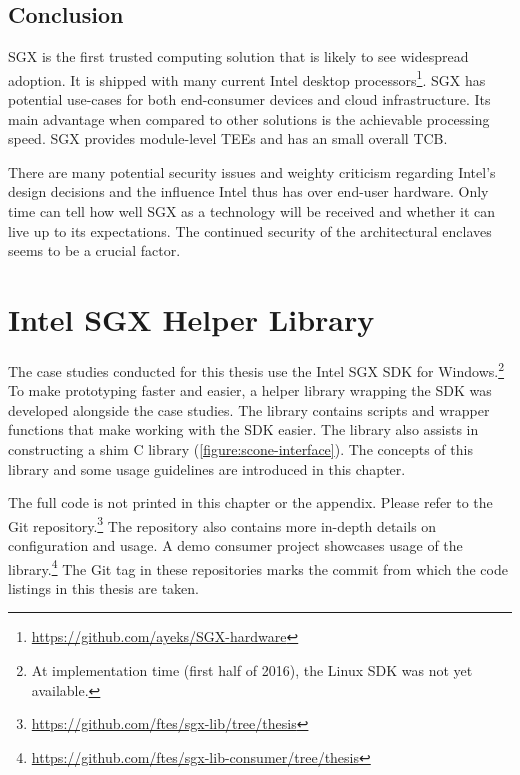 \section{Conclusion\label{ID_95827774}}
SGX is the first trusted computing solution that is likely to see widespread adoption.\label{ID_1283663236}
It is shipped with many current Intel desktop processors\footnote{\url{https://github.com/ayeks/SGX-hardware}}.\label{ID_1220353350}
SGX has potential use-cases for both end-consumer devices and cloud infrastructure.\label{ID_1092135395}
Its main advantage when compared to other solutions is the achievable processing speed. SGX provides module-level TEEs and has an small overall TCB.\label{ID_744293523}

There are many potential security issues and weighty criticism regarding Intel's design decisions and the influence Intel thus has over end-user hardware.\label{ID_856863719}
Only time can tell how well SGX as a technology will be received and whether it can live up to its expectations.\label{ID_1859137509}
The continued security of the architectural enclaves seems to be a crucial factor.\label{ID_773096886}

\chapter{Intel SGX Helper Library\label{ID_985966487}\label{chapter:sgx-lib}}
The case studies conducted for this thesis use the Intel SGX SDK for Windows.\footnote{At implementation time (first half of 2016), the Linux SDK was not yet available.}\label{ID_1132198097}
To make prototyping faster and easier, a helper library wrapping the SDK was developed alongside the case studies.\label{ID_111937508}
The library contains scripts and wrapper functions that make working with the SDK easier.\label{ID_1184988902}
The library also assists in constructing a shim C library (\autoref{figure:scone-interface}).\label{ID_1179607118}
The concepts of this library and some usage guidelines are introduced in this chapter.\label{ID_553638787}

The full code is not printed in this chapter or the appendix. Please refer to the Git repository.\footnote{\url{https://github.com/ftes/sgx-lib/tree/thesis}}\label{ID_1903948230}
The repository also contains more in-depth details on configuration and usage.\label{ID_191350613}
A demo consumer project showcases usage of the library.\footnote{\url{https://github.com/ftes/sgx-lib-consumer/tree/thesis}}\label{ID_1523691323}
The Git tag  in these repositories marks the commit from which the code listings in this thesis are taken.\label{ID_1811245411}

